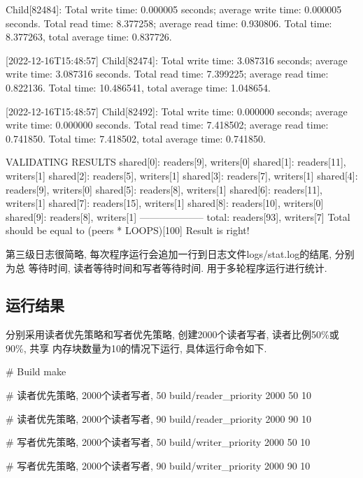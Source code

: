 \begin{code}
    [2022-12-16T15:48:55] Child[82484]:
    Total write time: 0.000005 seconds; average write time: 0.000005 seconds.
    Total read time: 8.377258; average read time: 0.930806.
    Total time: 8.377263, total average time: 0.837726.

        [2022-12-16T15:48:57] Child[82474]:
    Total write time: 3.087316 seconds; average write time: 3.087316 seconds.
    Total read time: 7.399225; average read time: 0.822136.
    Total time: 10.486541, total average time: 1.048654.

        [2022-12-16T15:48:57] Child[82492]:
    Total write time: 0.000000 seconds; average write time: 0.000000 seconds.
    Total read time: 7.418502; average read time: 0.741850.
    Total time: 7.418502, total average time: 0.741850.


    VALIDATING RESULTS
    shared[0]: readers[9], writers[0]
    shared[1]: readers[11], writers[1]
    shared[2]: readers[5], writers[1]
    shared[3]: readers[7], writers[1]
    shared[4]: readers[9], writers[0]
    shared[5]: readers[8], writers[1]
    shared[6]: readers[11], writers[1]
    shared[7]: readers[15], writers[1]
    shared[8]: readers[10], writers[0]
    shared[9]: readers[8], writers[1]
    --------------------
    total: readers[93], writers[7]
    Total should be equal to (peers * LOOPS)[100]
    Result is right!

\end{code}

第三级日志很简略, 每次程序运行会追加一行到日志文件logs/stat.log的结尾, 分别为总
等待时间, 读者等待时间和写者等待时间. 用于多轮程序运行进行统计.


\subsection{运行结果}
分别采用读者优先策略和写者优先策略, 创建2000个读者写者, 读者比例50\%或90\%, 共享
内存块数量为10的情况下运行, 具体运行命令如下. 
\begin{code}
    # Build
    make

    # 读者优先策略, 2000个读者写者, 50%
    build/reader_priority 2000 50 10
    
    # 读者优先策略, 2000个读者写者, 90%
    build/reader_priority 2000 90 10
    
    # 写者优先策略, 2000个读者写者, 50%
    build/writer_priority 2000 50 10

    # 写者优先策略, 2000个读者写者, 90%
    build/writer_priority 2000 90 10
\end{code}

